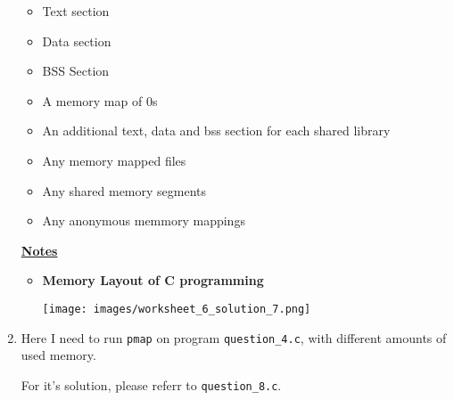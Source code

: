 \documentclass[12pt]{article}
\begin{document}
\begin{enumerate}[1.]
    \begin{itemize}
        \item Text section
        \item Data section
        \item BSS Section
        \item A memory map of 0s
        \item An additional text, data and bss section for each shared library
        \item Any memory mapped files
        \item Any shared memory segments
        \item Any anonymous memmory mappings
    \end{itemize}

    \bigskip

    \underline{\textbf{Notes}}

    \begin{itemize}
        \item \textbf{Memory Layout of C programming}

        \begin{center}
        \texttt{[image: images/worksheet\_6\_solution\_7.png]}
        \end{center}
    \end{itemize}

    \item

    Here I need to run \texttt{pmap} on program \texttt{question\_4.c}, with different
    amounts of used memory.

    \bigskip

    For it's solution, please referr to \texttt{question\_8.c}.

\end{enumerate}
\end{document}
